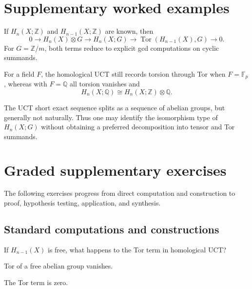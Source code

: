 \section{Supplementary worked examples}
\label{sec:viii26-pedagogy}

\begin{example}\label{ex:viii26-ped-01}
If $H_n(X;\mathbb Z)$ and $H_{n-1}(X;\mathbb Z)$ are known, then
\[
0\to H_n(X)\otimes G\to H_n(X;G)\to
\operatorname{Tor}(H_{n-1}(X),G)\to0.
\]
For $G=\mathbb Z/m$, both terms reduce to explicit gcd computations on cyclic summands.
\end{example}

\begin{example}\label{ex:viii26-ped-02}
For a field $F$, the homological UCT still records torsion through Tor when $F=\mathbb F_p$, whereas with $F=\mathbb Q$ all torsion vanishes and
\[
H_n(X;\mathbb Q)\cong H_n(X;\mathbb Z)\otimes\mathbb Q.
\]
\end{example}

\begin{example}\label{ex:viii26-ped-03}
The UCT short exact sequence splits as a sequence of abelian groups, but generally not naturally. Thus one may identify the isomorphism type of $H_n(X;G)$ without obtaining a preferred decomposition into tensor and Tor summands.
\end{example}

\section{Graded supplementary exercises}
The following exercises progress from direct computation and construction to proof, hypothesis testing, application, and synthesis.

\subsection*{Standard computations and constructions}

\begin{exercise}\label{exr:viii26-ped-01}
If $H_{n-1}(X)$ is free, what happens to the Tor term in homological UCT?
\end{exercise}
\begin{hint}
Tor of a free abelian group vanishes.
\end{hint}
\begin{solution}
The Tor term is zero.
\end{solution}


